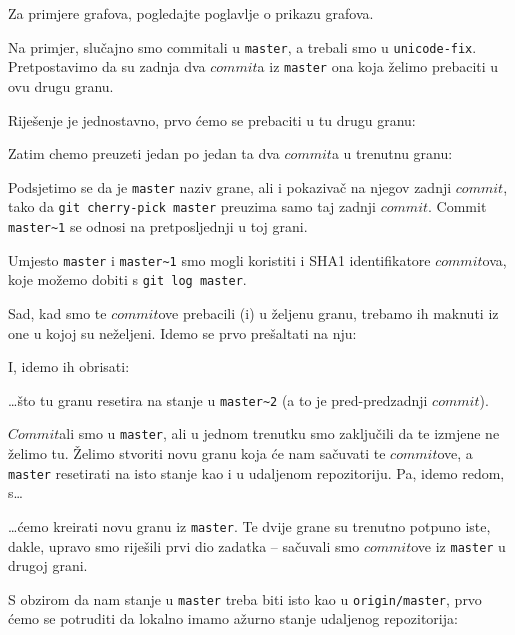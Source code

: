 Za primjere grafova, pogledajte poglavlje o prikazu grafova.


Na primjer, slučajno smo commitali u \verb+master+, a trebali smo u \verb+unicode-fix+.
Pretpostavimo da su zadnja dva $commit$a iz \verb+master+ ona koja želimo prebaciti u ovu drugu granu.

Riješenje je jednostavno, prvo ćemo se prebaciti u tu drugu granu:


Zatim chemo preuzeti jedan po jedan ta dva $commit$a u trenutnu granu:


Podsjetimo se da je \verb+master+ naziv grane, ali i pokazivač na njegov zadnji $commit$, tako da \verb+git cherry-pick master+ preuzima samo taj zadnji $commit$.
Commit \verb+master~1+ se odnosi na pretposljednji u toj grani.

Umjesto \verb+master+ i \verb+master~1+ smo mogli koristiti i SHA1 identifikatore $commit$ova, koje možemo dobiti s \verb+git log master+.

Sad, kad smo te $commit$ove prebacili (i) u željenu granu, trebamo ih maknuti iz one u kojoj su neželjeni.
Idemo se prvo prešaltati na nju:


I, idemo ih obrisati:


\dots{}što tu granu resetira na stanje u \verb+master~2+ (a to je pred-predzadnji $commit$).


$Commit$ali smo u \verb+master+, ali u jednom trenutku smo zaključili da te izmjene ne želimo tu.
Želimo stvoriti novu granu koja će nam sačuvati te $commit$ove, a \verb+master+ resetirati na isto stanje kao i u udaljenom repozitoriju.
Pa, idemo redom, s\dots


\dots{}ćemo kreirati novu granu iz \verb+master+.
Te dvije grane su trenutno potpuno iste, dakle, upravo smo riješili prvi dio zadatka -- sačuvali smo $commit$ove iz \verb+master+ u drugoj grani.

S obzirom da nam stanje u \verb+master+ treba biti isto kao u \verb+origin/master+, prvo ćemo se potruditi da lokalno imamo ažurno stanje udaljenog repozitorija:

